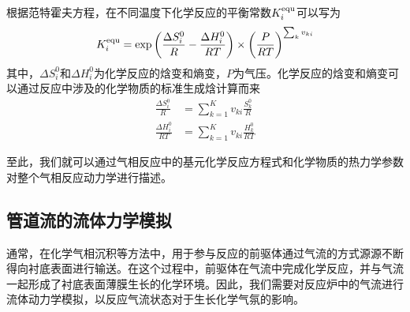 根据范特霍夫方程，在不同温度下化学反应的平衡常数$K_i^{\rm equ}$可以写为\chinesecolon
\begin{equation}
    K_i^{\rm equ}=\exp\left(\frac{\Delta S_i^0}{R}-\frac{\Delta H_i^0}{RT}\right)\times\left(\frac{P}{RT}\right)^{\sum_k v_{ki}}
\end{equation}
其中，$\Delta S_i^0$和$\Delta H_i^0$为化学反应的焓变和熵变，$P$为气压。化学反应的焓变和熵变可以通过反应中涉及的化学物质的标准生成焓计算而来\chinesecolon
\[
    \begin{split}
        \frac{\Delta S_i^0}{R}&=\sum_{k=1}^K v_{ki}\frac{S_k^0}{R}\\
        \frac{\Delta H_i^0}{RT}&=\sum_{k=1}^K v_{ki}\frac{H_k^0}{RT}
    \end{split}
\]

至此，我们就可以通过气相反应中的基元化学反应方程式和化学物质的热力学参数对整个气相反应动力学进行描述。

\subsection{管道流的流体力学模拟}
通常，在化学气相沉积等方法中，用于参与反应的前驱体通过气流的方式源源不断得向衬底表面进行输送。在这个过程中，前驱体在气流中完成化学反应，并与气流一起形成了衬底表面薄膜生长的化学环境。因此，我们需要对反应炉中的气流进行流体动力学模拟，以反应气流状态对于生长化学气氛的影响。

